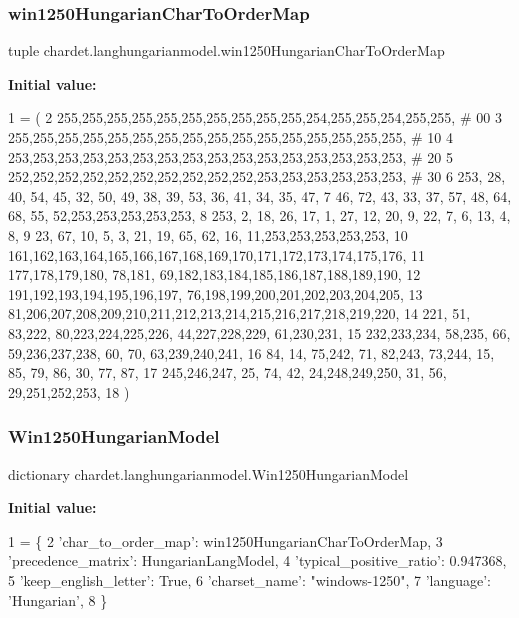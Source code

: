 \subsubsection{\texorpdfstring{win1250\+Hungarian\+Char\+To\+Order\+Map}{win1250HungarianCharToOrderMap}}
{\footnotesize\ttfamily tuple chardet.\+langhungarianmodel.\+win1250\+Hungarian\+Char\+To\+Order\+Map}

{\bfseries Initial value\+:}
\begin{DoxyCode}
1 =  (
2 255,255,255,255,255,255,255,255,255,255,254,255,255,254,255,255,  \textcolor{comment}{# 00}
3 255,255,255,255,255,255,255,255,255,255,255,255,255,255,255,255,  \textcolor{comment}{# 10}
4 253,253,253,253,253,253,253,253,253,253,253,253,253,253,253,253,  \textcolor{comment}{# 20}
5 252,252,252,252,252,252,252,252,252,252,253,253,253,253,253,253,  \textcolor{comment}{# 30}
6 253, 28, 40, 54, 45, 32, 50, 49, 38, 39, 53, 36, 41, 34, 35, 47,
7  46, 72, 43, 33, 37, 57, 48, 64, 68, 55, 52,253,253,253,253,253,
8 253,  2, 18, 26, 17,  1, 27, 12, 20,  9, 22,  7,  6, 13,  4,  8,
9  23, 67, 10,  5,  3, 21, 19, 65, 62, 16, 11,253,253,253,253,253,
10 161,162,163,164,165,166,167,168,169,170,171,172,173,174,175,176,
11 177,178,179,180, 78,181, 69,182,183,184,185,186,187,188,189,190,
12 191,192,193,194,195,196,197, 76,198,199,200,201,202,203,204,205,
13  81,206,207,208,209,210,211,212,213,214,215,216,217,218,219,220,
14 221, 51, 83,222, 80,223,224,225,226, 44,227,228,229, 61,230,231,
15 232,233,234, 58,235, 66, 59,236,237,238, 60, 70, 63,239,240,241,
16  84, 14, 75,242, 71, 82,243, 73,244, 15, 85, 79, 86, 30, 77, 87,
17 245,246,247, 25, 74, 42, 24,248,249,250, 31, 56, 29,251,252,253,
18 )
\end{DoxyCode}
\mbox{\label{namespacechardet_1_1langhungarianmodel_aba944c61ae0426b048c1543596e3a4e3}} 
\subsubsection{\texorpdfstring{Win1250\+Hungarian\+Model}{Win1250HungarianModel}}
{\footnotesize\ttfamily dictionary chardet.\+langhungarianmodel.\+Win1250\+Hungarian\+Model}

{\bfseries Initial value\+:}
\begin{DoxyCode}
1 =  \{
2   \textcolor{stringliteral}{'char\_to\_order\_map'}: win1250HungarianCharToOrderMap,
3   \textcolor{stringliteral}{'precedence\_matrix'}: HungarianLangModel,
4   \textcolor{stringliteral}{'typical\_positive\_ratio'}: 0.947368,
5   \textcolor{stringliteral}{'keep\_english\_letter'}: \textcolor{keyword}{True},
6   \textcolor{stringliteral}{'charset\_name'}: \textcolor{stringliteral}{"windows-1250"},
7   \textcolor{stringliteral}{'language'}: \textcolor{stringliteral}{'Hungarian'},
8 \}
\end{DoxyCode}

